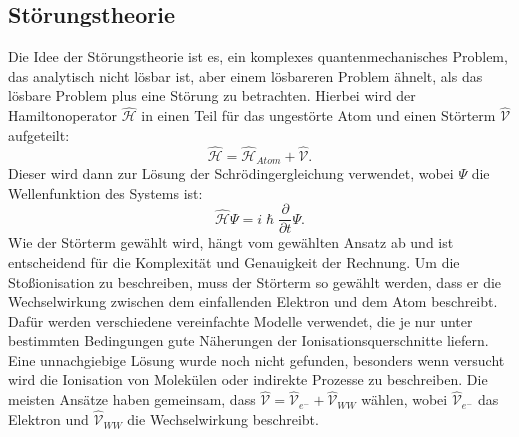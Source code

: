 \subsection{Störungstheorie}
Die Idee der Störungstheorie ist es, ein komplexes quantenmechanisches Problem, das analytisch nicht lösbar ist, aber einem lösbareren Problem ähnelt, als das lösbare Problem plus eine Störung zu betrachten. Hierbei wird der Hamiltonoperator $\hat{\mathcal{H}}$ in einen Teil für das ungestörte Atom und einen Störterm $\hat{\mathcal{V}}$ aufgeteilt:
\begin{equation}
    \hat{\mathcal{H}} = \hat{\mathcal{H}}_{Atom} + \hat{\mathcal{V}}.
\end{equation}
Dieser wird dann zur Lösung der Schrödingergleichung verwendet, wobei $\Psi$ die Wellenfunktion des Systems ist:
\begin{equation}
    \hat{\mathcal{H}} \Psi = i\hslash\frac{\partial}{\partial t}\Psi.
\end{equation}
Wie der Störterm gewählt wird, hängt vom gewählten Ansatz ab und ist entscheidend für die Komplexität und Genauigkeit der Rechnung. Um die Stoßionisation zu beschreiben, muss der Störterm so gewählt werden, dass er die Wechselwirkung zwischen dem einfallenden Elektron und dem Atom beschreibt. Dafür werden verschiedene vereinfachte Modelle verwendet, die je nur unter bestimmten Bedingungen gute Näherungen der Ionisationsquerschnitte liefern. Eine unnachgiebige Lösung wurde noch nicht gefunden, besonders wenn versucht wird die Ionisation von Molekülen oder indirekte Prozesse zu beschreiben. Die meisten Ansätze haben gemeinsam, dass $\hat{\mathcal{V}} = \hat{\mathcal{V}}_{e^-} + \hat{\mathcal{V}}_{WW}$ wählen, wobei $\hat{\mathcal{V}}_{e^-}$ das Elektron und $\hat{\mathcal{V}}_{WW}$ die Wechselwirkung  beschreibt. 

